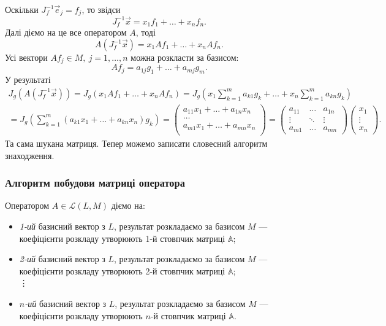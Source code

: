 \documentclass{math_library}
\begin{document}
	Оскільки $J_f^{-1} \vec{e}_j = f_j$, то звідси 
	\[
	J_f^{-1} \vec{x} = x_1f_1+\dots+x_nf_n.
	\]
	Далі діємо на це все оператором $A$, тоді
	\[
	A(J_f^{-1}\vec{x}) = x_1Af_1 + \dots + x_nAf_n.
	\]
	Усі вектори $Af_j \in M,\ j =1,\dots,n$ можна розкласти за базисом:
	\[
	Af_j = a_{1j}g_1 + \dots + a_{mj}g_m.
	\]
	У результаті
	\begin{align*}
	J_g(A(J_f^{-1}\vec{x})) = J_g(x_1Af_1 + \dots + x_nAf_n) = \displaystyle J_g\left(x_1 \sum_{k=1}^m a_{k1}g_k + \dots + x_n \sum_{k=1}^m a_{kn}g_k\right) \\ = J_g\left(\sum_{k=1}^m (a_{k1}x_1 + \dots + a_{kn}x_n)g_k \right) = \begin{pmatrix}
	a_{11}x_1 + \dots + a_{1n}x_n \\
	\dots \\
	a_{m1}x_1 + \dots + a_{mn}x_n \\
	\end{pmatrix} = \begin{pmatrix}
	a_{11} & \dots & a_{1n} \\
	\vdots & \ddots & \vdots \\
	a_{m1} & \dots & a_{mn}
	\end{pmatrix} \begin{pmatrix}
	x_1 \\ \vdots \\ x_n
	\end{pmatrix}.
	\end{align*}
	Та сама шукана матриця. Тепер можемо записати словесний алгоритм знаходження.
	
	\subsubsection*{Алгоритм побудови матриці оператора}
	Оператором $A \in \mathcal{L}(L,M)$ діємо на:
	\begin{itemize}[nosep,wide=0pt,label={--}]
	\item \textit{1-ий} базисний вектор з $L$, результат розкладаємо за базисом $M$ --- коефіцієнти розкладу утворюють 1-й стовпчик матриці $\mathbb{A}$;
	\item \textit{2-ий} базисний вектор з $L$, результат розкладаємо за базисом $M$ --- коефіцієнти розкладу утворюють 2-й стовпчик матриці $\mathbb{A}$;\\
	\vdots 
	\item $n$\textit{-ий} базисний вектор з $L$, результат розкладаємо за базисом $M$ --- коефіцієнти розкладу утворюють $n$-й стовпчик матриці $\mathbb{A}$.
	\end{itemize}
	
\end{document}
